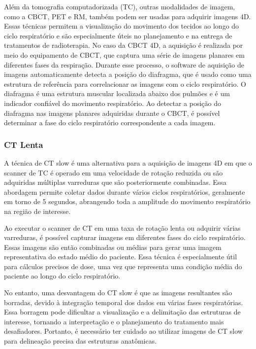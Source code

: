 \documentclass[11pt,a4paper]{article}
\begin{document}
	Além da tomografia computadorizada (TC), outras modalidades de imagem, como a CBCT, PET e RM, também podem ser usadas para adquirir imagens 4D. Essas técnicas permitem a visualização do movimento dos tecidos ao longo do ciclo respiratório e são especialmente úteis no planejamento e na entrega de tratamentos de radioterapia. No caso da CBCT 4D, a aquisição é realizada por meio do equipamento de CBCT, que captura uma série de imagens planares em diferentes fases da respiração. Durante esse processo, o software de aquisição de imagens automaticamente detecta a posição do diafragma, que é usado como uma estrutura de referência para correlacionar as imagens com o ciclo respiratório. O diafragma é uma estrutura muscular localizada abaixo dos pulmões e é um indicador confiável do movimento respiratório. Ao detectar a posição do diafragma nas imagens planares adquiridas durante o CBCT, é possível determinar a fase do ciclo respiratório correspondente a cada imagem.


\subsubsection*{CT Lenta}

	A técnica de CT slow é uma alternativa para a aquisição de imagens 4D em que o scanner de TC é operado em uma velocidade de rotação reduzida ou são adquiridas múltiplas varreduras que são posteriormente combinadas. Essa abordagem permite coletar dados durante vários ciclos respiratórios, geralmente em torno de 5 segundos, abrangendo toda a amplitude do movimento respiratório na região de interesse. 

	Ao executar o scanner de CT em uma taxa de rotação lenta ou adquirir várias varreduras, é possível capturar imagens em diferentes fases do ciclo respiratório. Essas imagens são então combinadas ou médias para gerar uma imagem representativa do estado médio do paciente. Essa técnica é especialmente útil para cálculos precisos de dose, uma vez que representa uma condição média do paciente ao longo do ciclo respiratório.

	No entanto, uma desvantagem do CT slow é que as imagens resultantes são borradas, devido à integração temporal dos dados em várias fases respiratórias. Essa borragem pode dificultar a visualização e a delimitação das estruturas de interesse, tornando a interpretação e o planejamento do tratamento mais desafiadores. Portanto, é necessário ter cuidado ao utilizar imagens de CT slow para delineação precisa das estruturas anatômicas.
\end{document}
